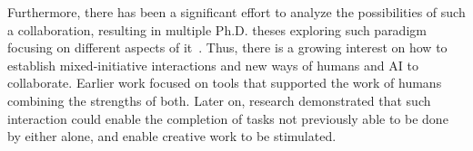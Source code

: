 Furthermore, there has been a significant effort to analyze the possibilities of such a collaboration, resulting in multiple Ph.D. theses exploring such paradigm focusing on different aspects of it~\cite{SmithPhD,LiapisPhD,ComptonPhD,GuzdialPhD,MachadoPhD}. Thus, there is a growing interest on how to establish mixed-initiative interactions and new ways of humans and AI to collaborate. Earlier work focused on tools that supported the work of humans combining the strengths of both. Later on, research demonstrated that such interaction could enable the completion of tasks not previously able to be done by either alone, and enable creative work to be stimulated. 




